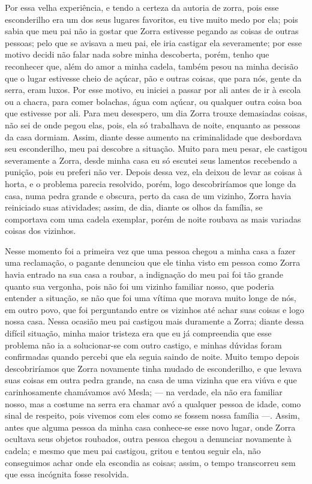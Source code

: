 Por essa velha experiência, e tendo a certeza da autoria de zorra, pois esse esconderilho era um dos seus lugares favoritos, eu tive muito medo por ela; pois sabia que meu pai não ia gostar que Zorra estivesse pegando as coisas de outras pessoas; pelo que se avisava a meu pai, ele iria castigar ela severamente; por esse motivo decidi não falar nada sobre minha descoberta, porém, tenho que reconhecer que, além do amor a minha cadela, também pesou na minha decisão que o lugar estivesse cheio de açúcar, pão e outras coisas, que para nós, gente da serra, eram luxos. 
Por esse motivo, eu iniciei a passar por ali antes de ir à escola ou a chacra, para comer bolachas, água com açúcar, ou qualquer outra coisa boa que estivesse por ali. 
Para meu desespero, um dia Zorra trouxe demasiadas coisas, não sei de onde pegou elas, pois, ela só trabalhava de noite, enquanto as pessoas da casa dormiam. Assim, diante desse aumento na criminalidade que desbordava seu esconderilho, meu pai descobre a situação.
Muito para meu pesar, ele castigou severamente a Zorra, desde minha casa eu só escutei seus lamentos recebendo a punição, pois eu preferi não ver.
Depois dessa vez, ela deixou de  levar as coisas à horta, e o problema parecia resolvido, porém, logo descobriríamos que longe da casa, numa pedra grande e obscura, perto da casa de um vizinho, Zorra havia reiniciado suas atividades; assim, de dia, diante os olhos da família, se comportava com uma cadela exemplar, porém de noite roubava as mais variadas coisas dos vizinhos.

Nesse momento foi a primeira vez que uma pessoa chegou a minha casa a fazer uma reclamação, o pagante denunciou que ele tinha visto em pessoa como Zorra havia entrado na sua casa a roubar, a indignação do meu pai foi tão grande quanto sua vergonha, pois não foi um vizinho familiar nosso, que poderia entender a situação, se não que foi uma vítima que morava muito longe de nós, em outro povo, que foi perguntando entre os vizinhos até achar suas coisas e logo nossa casa.
Nessa ocasião meu pai castigou mais duramente a Zorra; diante dessa difícil situação, minha maior tristeza era que eu já compreendia que esse problema não ia a solucionar-se com outro castigo, e minhas dúvidas foram confirmadas quando percebi que ela seguia saindo de noite. 
Muito tempo depois descobriríamos que Zorra novamente tinha mudado de esconderilho, e que levava suas coisas em outra pedra grande, na casa de uma vizinha que era viúva e que carinhosamente chamávamos avó Mesla; --- na verdade, ela não era familiar nosso, mas a costume na serra era chamar avó a qualquer pessoa de idade, como sinal de respeito, pois vivemos com eles como se fossem nossa família ---.
Assim, antes que alguma pessoa da minha casa conhece-se esse novo lugar, onde Zorra ocultava seus objetos roubados, outra pessoa chegou a denunciar novamente à cadela; e mesmo que meu pai castigou, gritou e tentou seguir ela, não conseguimos achar onde ela escondia as coisas; assim, o tempo transcorreu sem que essa incógnita fosse resolvida. 

